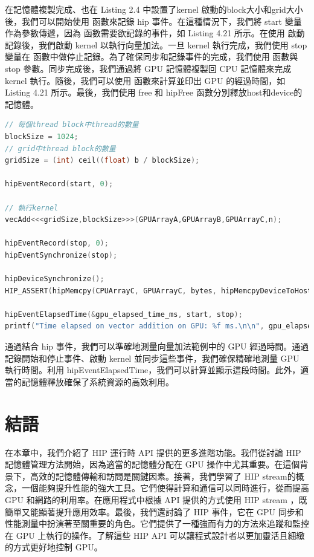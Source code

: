 在記憶體複製完成、也在 Listing 2.4 中設置了kernel 啟動的block大小和grid大小後，我們可以開始使用  函數來記錄 hip 事件。在這種情況下，我們將 start 變量作為參數傳遞，因為  函數需要欲記錄的事件，如 Listing 4.21 所示。在使用  啟動記錄後，我們啟動 kernel 以執行向量加法。一旦 kernel 執行完成，我們使用 stop 變量在  函數中做停止記錄。為了確保同步和記錄事件的完成，我們使用  函數與 stop 參數。同步完成後，我們通過將 GPU 記憶體複製回 CPU 記憶體來完成 kernel 執行。隨後，我們可以使用  函數來計算並印出 GPU 的經過時間，如 Listing 4.21 所示。最後，我們使用 free 和 hipFree 函數分別釋放host和device的記憶體。

\begin{lstlisting}[language=C, caption={組織 thread 與啟動 kernel}, label={21st:example}]
// 每個thread block中thread的數量
blockSize = 1024;
// grid中thread block的數量
gridSize = (int) ceil((float) b / blockSize);

hipEventRecord(start, 0);

// 執行kernel
vecAdd<<<gridSize,blockSize>>>(GPUArrayA,GPUArrayB,GPUArrayC,n);

hipEventRecord(stop, 0);
hipEventSynchronize(stop);

hipDeviceSynchronize();
HIP_ASSERT(hipMemcpy(CPUArrayC, GPUArrayC, bytes, hipMemcpyDeviceToHost));

hipEventElapsedTime(&gpu_elapsed_time_ms, start, stop);
printf("Time elapsed on vector addition on GPU: %f ms.\n\n", gpu_elapsed_time_ms);
\end{lstlisting}

通過結合 hip 事件，我們可以準確地測量向量加法範例中的 GPU 經過時間。通過記錄開始和停止事件、啟動 kernel 並同步這些事件，我們確保精確地測量 GPU 執行時間。利用 hipEventElapsedTime，我們可以計算並顯示這段時間。此外，適當的記憶體釋放確保了系統資源的高效利用。

\section{結語}
在本章中，我們介紹了 HIP 運行時 API 提供的更多進階功能。我們從討論 HIP 記憶體管理方法開始，因為適當的記憶體分配在 GPU 操作中尤其重要。在這個背景下，高效的記憶體傳輸和訪問是關鍵因素。接著，我們學習了 HIP stream的概念，一個能夠提升性能的強大工具。它們使得計算和通信可以同時進行，從而提高 GPU 和網路的利用率。在應用程式中根據 API 提供的方式使用 HIP stream ，既簡單又能顯著提升應用效率。最後，我們還討論了 HIP 事件，它在 GPU 同步和性能測量中扮演著至關重要的角色。它們提供了一種強而有力的方法來追蹤和監控在 GPU 上執行的操作。了解這些 HIP API 可以讓程式設計者以更加靈活且細緻的方式更好地控制 GPU。

% 